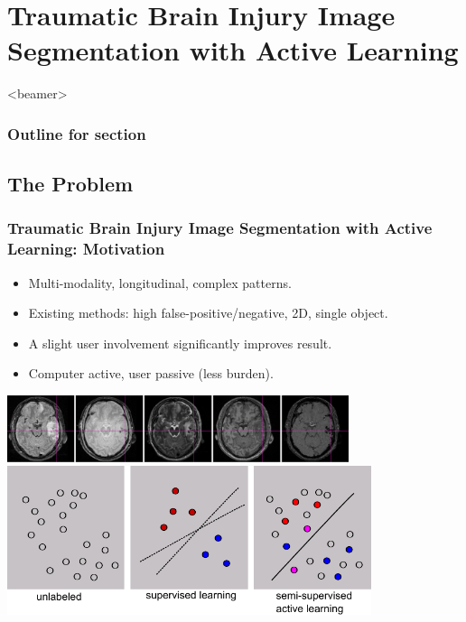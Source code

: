 \documentclass[sansserif, 10pt]{beamer}
\begin{document}
\section{Traumatic Brain Injury Image Segmentation with Active Learning}

\begin{frame}<beamer>
  \frametitle{Outline for section \thesection}
  \tableofcontents[currentsection, sectionstyle=show/hide, subsectionstyle=show/show/hide]
\end{frame}

\subsection{The Problem}
\begin{frame}
  \frametitle{Traumatic Brain Injury Image Segmentation with Active Learning: Motivation}
  \begin{block}{}
    \begin{itemize}
      \item Multi-modality, longitudinal, complex patterns. 
      \item Existing methods: high false-positive/negative, 2D, single object.
      \item A slight user involvement significantly improves result.
      \item Computer active, user passive (less burden).
    \end{itemize}
  \end{block}
  \centering
  \includegraphics[width=0.75\textwidth]{actlearn_fig/allchannels}\\
  \vspace{2pt}
  \includegraphics[width=0.8\textwidth]{actlearn_fig/activelearn}
\end{frame}
\end{document}
